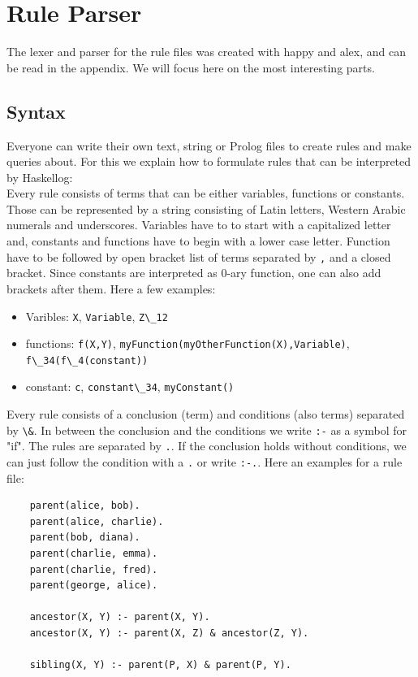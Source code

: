 \section{Rule Parser}
The lexer and parser for the rule files was created with happy and alex, and can be read in the appendix. We will focus here on the most interesting parts.
\subsection{Syntax}
Everyone can write their own text, string or Prolog files to create rules and make queries about. For this we explain how to formulate rules that 
can be interpreted by Haskellog:\\
Every rule consists of terms that can be either variables, functions or constants. Those can be represented by a string consisting of Latin letters, Western Arabic numerals and underscores. Variables have to 
to start with a capitalized letter and, constants and functions have to begin with a lower case letter. Function have to be followed by open bracket
list of terms separated by \verb|,| and a closed bracket. Since constants are interpreted as 0-ary function, one can also add brackets after them. Here a few examples: 
\begin{itemize}
    \item Varibles: \verb|X|, \verb|Variable|, \verb|Z\_12|
    \item functions: \verb|f(X,Y)|, \verb|myFunction(myOtherFunction(X),Variable)|, \verb|f\_34(f\_4(constant))|
    \item constant: \verb|c|, \verb|constant\_34|, \verb|myConstant()|
\end{itemize}
Every rule consists of a conclusion (term) and conditions (also terms) separated by \verb|\&|. In between the conclusion and the conditions we write \verb|:-| as a symbol 
for "if". The rules are separated by \verb|.|. If the conclusion holds without conditions, we can just follow the condition with a \verb|.| or write \verb|:-.|. 
Here an examples for a rule file\cite{Wikibooks}:
\begin{verbatim}
    parent(alice, bob).
    parent(alice, charlie).
    parent(bob, diana).
    parent(charlie, emma).
    parent(charlie, fred).
    parent(george, alice).

    ancestor(X, Y) :- parent(X, Y).
    ancestor(X, Y) :- parent(X, Z) & ancestor(Z, Y).

    sibling(X, Y) :- parent(P, X) & parent(P, Y).
\end{verbatim}

